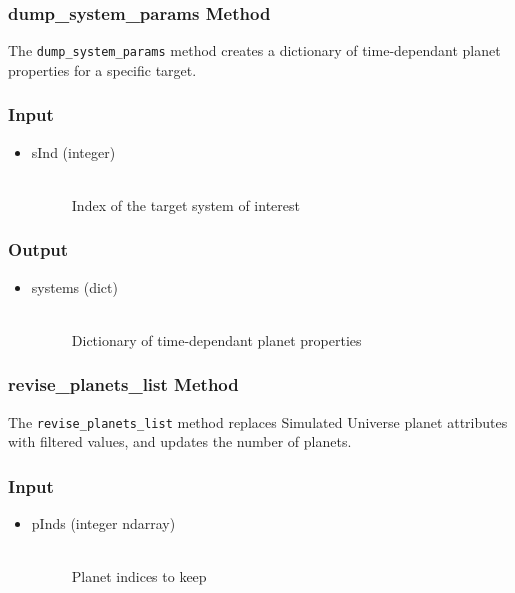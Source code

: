 \documentclass[cleanfoot]{asme2ej}
\begin{document}
\subsubsection{dump\_system\_params Method} \label{sec:dumpsystemparamstask}
The \verb+dump_system_params+ method creates a dictionary of time-dependant planet properties for a specific target.
\subsubsection*{Input}
\begin{itemize}
\item 
\begin{description}
    \item[sInd (integer)] \hfill \\ Index of the target system of interest
\end{description}
\end{itemize}
\subsubsection*{Output}
\begin{itemize}
\item 
\begin{description}
    \item[systems (dict)] \hfill \\ Dictionary of time-dependant planet properties
\end{description}
\end{itemize}

\subsubsection{revise\_planets\_list Method} \label{sec:reviseplanetslisttask}
The \verb+revise_planets_list+ method replaces Simulated Universe planet attributes with filtered values, and updates the number of planets.
\subsubsection*{Input}
\begin{itemize}
\item 
\begin{description}
    \item[pInds (integer ndarray)] \hfill \\  Planet indices to keep
\end{description}
\end{itemize}
\end{document}

